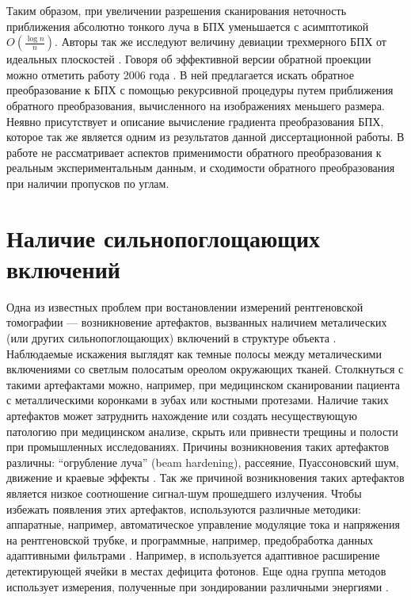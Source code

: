 Таким образом, при увеличении разрешения сканирования неточность приближения абсолютно тонкого луча в БПХ уменьшается с асимптотикой $O\left(\frac {\log n}{n}\right)$.
Авторы так же исследуют величину девиации трехмерного БПХ от идеальных плоскостей \cite{ershov3DHough}.
Говоря об эффективной версии обратной проекции можно отметить работу 2006 года \cite{Press_2006_invDRT}.
В ней предлагается искать обратное преобразование к БПХ с помощью рекурсивной процедуры путем приближения обратного преобразования, вычисленного на изображениях меньшего размера.
Неявно присутствует и описание вычисление градиента преобразования БПХ, которое так же является одним из результатов данной диссертационной работы.
В работе не рассматривает аспектов применимости обратного преобразования к реальным экспериментальным данным, и сходимости обратного преобразования при наличии пропусков по углам.

\section{Наличие сильнопоглощающих включений}

Одна из известных проблем при востановлении измерений рентгеновской томографии --- возникновение артефактов, вызванных наличием металических (или других сильнопоглощающих) включений в структуре объекта \cite{barrett2004artifacts, boas2012ct, nasirudin2015reduction, park2015computed}.
Наблюдаемые искажения выглядят как темные полосы между металическими включениями со светлым полосатым ореолом окружающих тканей.
Столкнуться с такими артефактами можно, например, при медицинском сканировании пациента с металлическими коронками в зубах или костными протезами.
Наличие таких артефактов может затруднить нахождение или создать несуществующую патологию при медицинском анализе, скрыть или привнести трещины и полости при промышленных исследованиях.
Причины возникновения таких артефактов различны: ``огрубление луча'' (beam hardening), рассеяние, Пуассоновский шум, движение и краевые эффекты \cite{boas2012ct}.
Так же причиной возникновения таких артефактов является низкое соотношение сигнал-шум прошедшего излучения.
Чтобы избежать появления этих артефактов, используются различные методики: аппаратные, например, автоматическое управление модуляцие тока и напряжения на рентгеновской трубке, и программные, например, предобработка данных адаптивными фильтрами \cite{zhang2007reducing}.
Например, в \cite{boas2012ct} используется адаптивное расширение детектирующей ячейки в местах дефицита фотонов.
Еще одна группа методов использует измерения, полученные при зондировании различными энергиями \cite{bamberg2011metal, kuchenbecker2015dual}.

